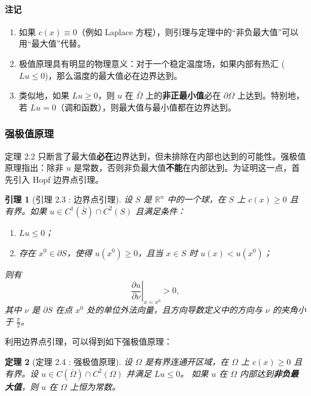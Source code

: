 \documentclass[12pt,a4paper]{ctexart}
\newtheorem{theorem}{定理}[section]
\newtheorem{lemma}[theorem]{引理}
\begin{document}
	\paragraph{注记}
	\begin{enumerate}
		\item 如果 $c(x) \equiv 0$（例如 Laplace 方程），则引理与定理中的“非负最大值”可以用“最大值”代替。
		\item 极值原理具有明显的物理意义：对于一个稳定温度场，如果内部有热汇 ($Lu \le 0$)，那么温度的最大值必在边界达到。
		\item 类似地，如果 $Lu \ge 0$，则 $u$ 在 $\bar{\Omega}$ 上的\textbf{非正最小值}必在 $\partial \Omega$ 上达到。特别地，若 $Lu=0$（调和函数），则最大值与最小值都在边界达到。
	\end{enumerate}
	
	\subsubsection{强极值原理}
	
	定理 2.2 只断言了最大值\textbf{必在}边界达到，但未排除在内部也达到的可能性。强极值原理指出：除非 $u$ 是常数，否则非负最大值\textbf{不能}在内部达到。为证明这一点，首先引入 Hopf 边界点引理。
	
	\begin{lemma}[引理 2.3 : 边界点引理]
		设 $S$ 是 $\mathbb{R}^n$ 中的一个球，在 $S$ 上 $c(x) \ge 0$ 且有界。如果 $u \in C^1(\bar{S}) \cap C^2(S)$ 且满足条件：
		\begin{enumerate}
			\item $Lu \le 0$；
			\item 存在 $x^0 \in \partial S$，使得 $u(x^0) \ge 0$，且当 $x \in S$ 时 $u(x) < u(x^0)$；
		\end{enumerate}
		则有
		\begin{equation}
			\left. \frac{\partial u}{\partial \nu} \right|_{x=x^0} > 0,
		\end{equation}
		其中 $\nu$ 是 $\partial S$ 在点 $x^0$ 处的单位外法向量，且方向导数定义中的方向与 $\nu$ 的夹角小于 $\frac{\pi}{2}$。
	\end{lemma}
	
	利用边界点引理，可以得到如下强极值原理：
	
	\begin{theorem}[定理 2.4 : 强极值原理]
		设 $\Omega$ 是有界连通开区域，在 $\Omega$ 上 $c(x) \ge 0$ 且有界。设 $u \in C(\bar{\Omega}) \cap C^2(\Omega)$ 并满足 $Lu \le 0$。
		如果 $u$ 在 $\Omega$ 内部达到\textbf{非负最大值}，则 $u$ 在 $\Omega$ 上恒为常数。
	\end{theorem}
	
\end{document}
